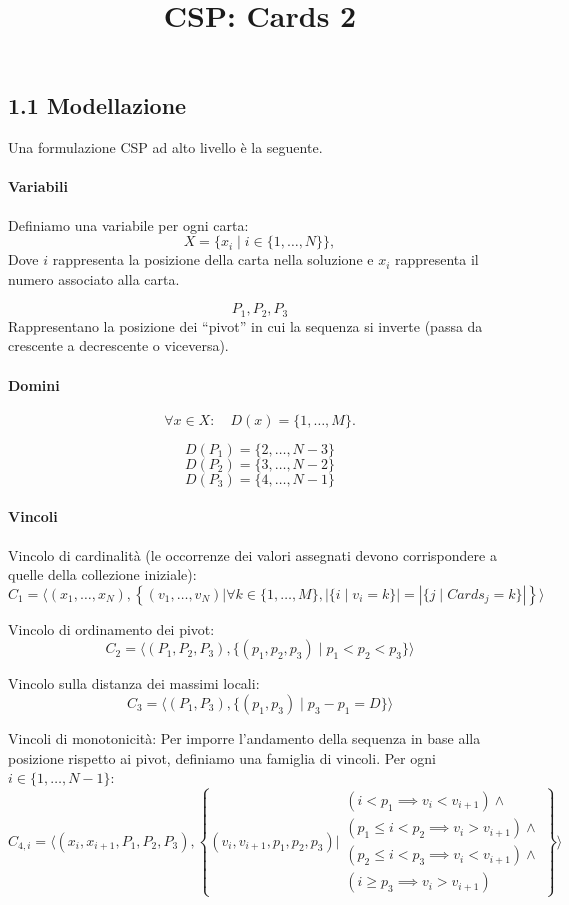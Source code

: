 \documentclass[a4paper,11pt]{article}
\title{CSP: Cards 2}
\date{}
\begin{document}
\maketitle

\subsection*{1.1 Modellazione} 
Una formulazione CSP ad alto livello è la seguente.

\paragraph{Variabili}
Definiamo una variabile per ogni carta:
\[
X = \{x_{i} \mid i \in \{1, \ldots, N\}\},
\]
Dove $i$ rappresenta la posizione della carta nella soluzione e $x_{i}$ rappresenta il numero associato alla carta.

\[
P_1, P_2, P_3
\]
Rappresentano la posizione dei ``pivot'' in cui la sequenza si inverte (passa da crescente a decrescente o viceversa).

\paragraph{Domini}
\[
\forall x \in X:\quad D(x)=\{1,\ldots,M\}.
\]

\[ 
D(P_1) = \{2, \ldots, N-3\}
\]
\[
D(P_2) = \{3, \ldots, N-2\}
\]
\[
D(P_3) = \{4, \ldots, N-1\}
\]

\paragraph{Vincoli}

Vincolo di cardinalità (le occorrenze dei valori assegnati devono corrispondere a quelle della collezione iniziale):
\[
C_1 = \langle (x_1, \ldots, x_N), \left\{ (v_1, \ldots, v_N) \mathrel{\Big|} \forall k \in \{1, \ldots, M\}, |\{i \mid v_i = k\}| = |\{j \mid Cards_j = k\}| \right\} \rangle
\]

Vincolo di ordinamento dei pivot:
\[
C_2 = \langle (P_1, P_2, P_3), \{ (p_1, p_2, p_3) \mid p_1 < p_2 < p_3 \} \rangle
\]

Vincolo sulla distanza dei massimi locali:
\[
C_3 = \langle (P_1, P_3), \{ (p_1, p_3) \mid p_3 - p_1 = D \} \rangle
\]

Vincoli di monotonicità:
Per imporre l'andamento della sequenza in base alla posizione rispetto ai pivot, definiamo una famiglia di vincoli. Per ogni $i \in \{1, \ldots, N - 1\}$:
\[
C_{4,i} = \langle (x_i, x_{i+1}, P_1, P_2, P_3), \left\{ (v_i, v_{i+1}, p_1, p_2, p_3) \mathrel{\Bigg|} 
\begin{array}{l}
(i < p_1 \implies v_i < v_{i+1}) \land \\
(p_1 \le i < p_2 \implies v_i > v_{i+1}) \land \\
(p_2 \le i < p_3 \implies v_i < v_{i+1}) \land \\
(i \ge p_3 \implies v_i > v_{i+1})
\end{array}
\right\} \rangle
\]
\end{document}
